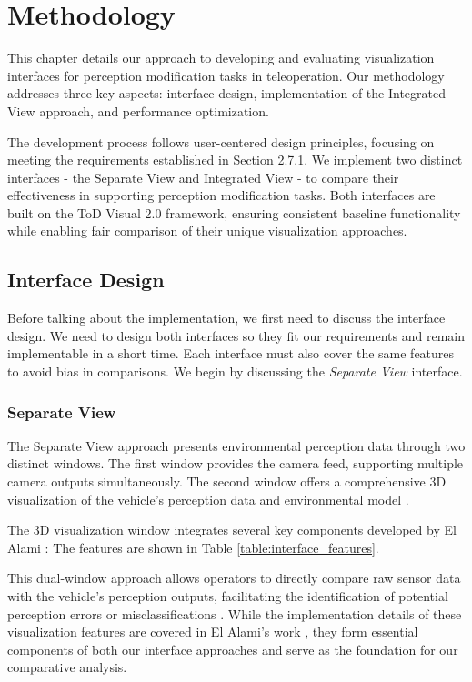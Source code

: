 
\chapter{Methodology}\label{chapter:methodology}
This chapter details our approach to developing and evaluating visualization interfaces for perception modification tasks in teleoperation. Our methodology addresses three key aspects: interface design, implementation of the Integrated View approach, and performance optimization.

The development process follows user-centered design principles, focusing on meeting the requirements established in Section 2.7.1. We implement two distinct interfaces - the Separate View and Integrated View - to compare their effectiveness in supporting perception modification tasks. Both interfaces are built on the ToD Visual 2.0 framework, ensuring consistent baseline functionality while enabling fair comparison of their unique visualization approaches.
\section{Interface Design}
Before talking about the implementation, we first need to discuss the interface design.
We need to design both interfaces so they fit our requirements and remain implementable in a short time. Each interface must also cover the same features to avoid bias in comparisons.
We begin by discussing the \emph{Separate View} interface.



\subsection{Separate View}
The Separate View approach presents environmental perception data through two distinct windows. The first window provides the camera feed, supporting multiple camera outputs simultaneously. The second window offers a comprehensive 3D visualization of the vehicle's perception data and environmental model \cite{Kettwich}.

The 3D visualization window integrates several key components developed by El Alami \cite{yassinethesis}: The features are shown in Table \ref{table:interface_features}.

This dual-window approach allows operators to directly compare raw sensor data with the vehicle's perception outputs, facilitating the identification of potential perception errors or misclassifications \cite{Georg}. While the implementation details of these visualization features are covered in El Alami's work \cite{yassinethesis}, they form essential components of both our interface approaches and serve as the foundation for our comparative analysis.


